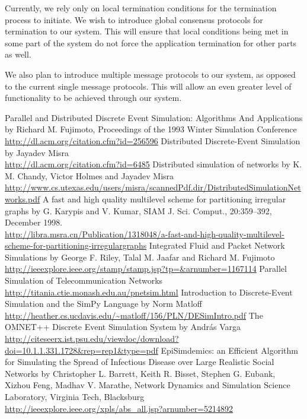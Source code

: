 \documentclass[12pt,a4paper]{article}
\begin{document}
Currently, we rely only on local termination conditions for the termination process to initiate. We wish to introduce global consensus protocols for termination to our system. This will ensure that local conditions being met in some part of the system do not force the application termination for other parts as well.

We also plan to introduce multiple message protocols to our system, as opposed to the current single message protocols. This will allow an even greater level of functionality to be achieved through our system.
 

\begin{thebibliography}{99}
Parallel and Distributed Discrete Event Simulation: Algorithms And Applications by Richard M. Fujimoto, Proceedings of the 1993 Winter Simulation Conference
\\ \url{http://dl.acm.org/citation.cfm?id=256596}
Distributed Discrete-Event Simulation by Jayadev Misra
\\ \url{http://dl.acm.org/citation.cfm?id=6485}
Distributed simulation of networks by K. M. Chandy, Victor Holmes and Jayadev Misra
\\ \url{http://www.cs.utexas.edu/users/misra/scannedPdf.dir/DistributedSimulationNetworks.pdf}
A fast and high quality multilevel scheme for partitioning irregular graphs by G. Karypis and V. Kumar, SIAM J. Sci. Comput., 20:359–392, December 1998.
\\ \url{http://libra.msra.cn/Publication/1318048/a-fast-and-high-quality-multilevel-scheme-for-partitioning-irregulargraphs}
Integrated Fluid and Packet Network Simulations by George F. Riley, Talal M. Jaafar and Richard M. Fujimoto
\\ \url{http://ieeexplore.ieee.org/stamp/stamp.jsp?tp=&arnumber=1167114}
Parallel Simulation of Telecommunication Networks \url{http://titania.ctie.monash.edu.au/pnetsim.html}
Introduction to Discrete-Event Simulation and the SimPy Language by Norm Matloff
\\ \url{http://heather.cs.ucdavis.edu/~matloff/156/PLN/DESimIntro.pdf}
The OMNET++ Discrete Event Simulation System by András Varga
\\ \url{http://citeseerx.ist.psu.edu/viewdoc/download?doi=10.1.1.331.1728&rep=rep1&type=pdf}
EpiSimdemics: an Efficient Algorithm for Simulating the Spread of Infectious Disease over Large Realistic Social Networks by Christopher L. Barrett, Keith R. Bisset, Stephen G. Eubank, Xizhou Feng, Madhav V. Marathe, Network Dynamics and Simulation Science Laboratory, Virginia Tech, Blacksburg
\\ \url{http://ieeexplore.ieee.org/xpls/abs_all.jsp?arnumber=5214892}
\end{thebibliography}
\end{document}
